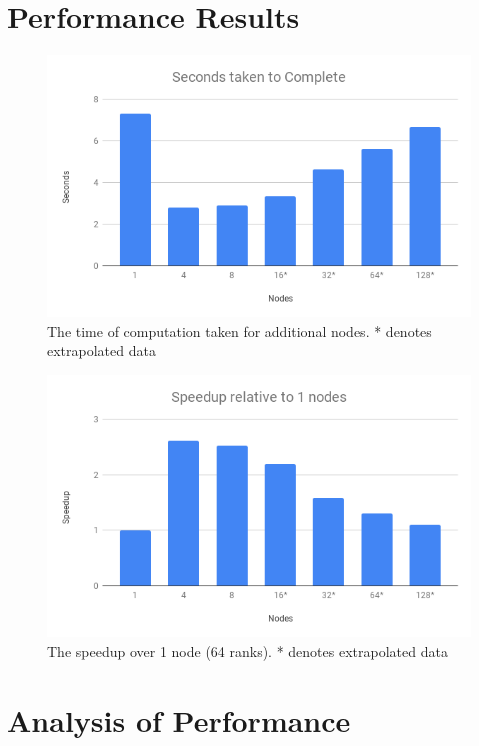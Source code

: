 \documentclass[10pt,a4paper]{article}
\begin{document}
\section{Performance Results}

\begin{figure}[H]
    \centering
    \includegraphics[scale=0.3]{seconds.png}
    \caption{The time of computation taken for additional nodes. * denotes extrapolated data}
    \label{fig:my_label}
\end{figure}

\begin{figure}[H]
    \centering
    \includegraphics[scale=0.3]{speedup.png}
    \caption{The speedup over 1 node (64 ranks). * denotes extrapolated data}
    \label{fig:my_label}
\end{figure}


\section{Analysis of Performance}
\end{document}
